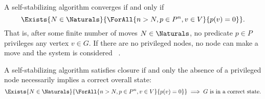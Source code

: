A self-stabilizing algorithm converges if and only if
\begin{equation}
  \label{eq:define-ssalg:converge}
  \Exists{N \in \Naturals}{\ForAll{n > N, p \in P^n, v \in V}{p(v) = 0}}.
\end{equation}
That is, after some finite number of moves $N \in \Naturals$,
  no predicate $p \in P$ privileges any vertex $v \in G$.
If there are no privileged nodes, no node can make a move and
  the system is considered ~\autocite{dew:sem}.

A self-stabilizing algorithm satisfies closure if and only
  the absence of a privileged node necessarily implies a correct overall state:
\begin{equation}
  \label{eq:define-ssalg:closure}
  \Exists{N \in \Naturals}{\ForAll{n > N, p \in P^n, v \in V}{p(v) = 0}}
  \implies \text{$G$ is in a correct state}.
\end{equation}

